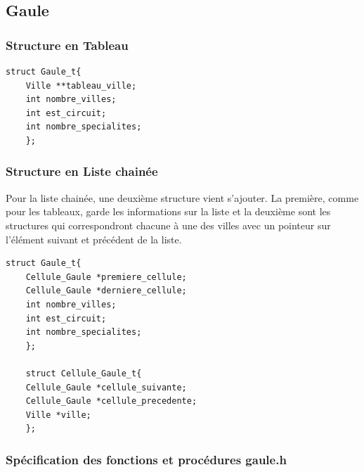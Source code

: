 \documentclass[a4paper, 11pt, oneside]{article}
\begin{document}
\subsection{\textbf{Gaule}}
\subsubsection{Structure en Tableau}
\begin{lstlisting}[caption = {Structure "Gaule" dans l'implémentation en tableau}]
    struct Gaule_t{
    Ville **tableau_ville;
    int nombre_villes;
    int est_circuit;
    int nombre_specialites;
    };
\end{lstlisting}



\subsubsection{Structure en Liste chainée}
    Pour la liste chainée, une deuxième structure vient s'ajouter. La première, comme pour les tableaux, 
    garde les informations sur la liste et la deuxième sont les structures qui correspondront chacune à une 
    des villes avec un pointeur sur l'élément suivant et précédent de la liste.
\begin{lstlisting}[caption = {Structure "Gaule" dans l'implémentation en tableau}]
    struct Gaule_t{
    Cellule_Gaule *premiere_cellule;
    Cellule_Gaule *derniere_cellule;
    int nombre_villes;
    int est_circuit;
    int nombre_specialites;
    };

    struct Cellule_Gaule_t{
    Cellule_Gaule *cellule_suivante;
    Cellule_Gaule *cellule_precedente;
    Ville *ville;
    };
\end{lstlisting}

\subsubsection{Spécification des fonctions et procédures gaule.h}
\end{document}
